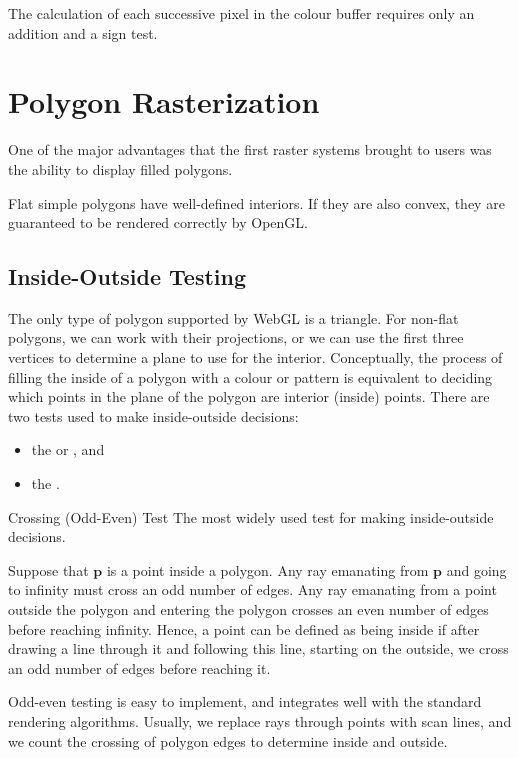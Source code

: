 \documentclass[../COS3712_Notes.tex]{subfiles}
\begin{document}
      The calculation of each successive pixel in the colour buffer requires only an addition
      and a sign test.

    \section{Polygon Rasterization}
      One of the major advantages that the first raster systems brought to users
      was the ability to display filled polygons.

      Flat simple polygons have well-defined interiors.
      If they are also convex, they are guaranteed to be rendered correctly by OpenGL.

      \subsection{Inside-Outside Testing}
        The only type of polygon supported by WebGL is a triangle.
        For non-flat polygons, we can work with their projections, or we can use
        the first three vertices to determine a plane to use for the interior.
        Conceptually, the process of filling the inside of a polygon with a colour or pattern
        is equivalent to deciding which points in the plane of the polygon are interior (inside)
        points.
        There are two tests used to make inside-outside decisions:
        \begin{itemize}[nosep]
          \item the  or , and
          \item the .
        \end{itemize}

        \begin{definition}{Crossing (Odd-Even) Test}
          The most widely used test for making inside-outside decisions.

          Suppose that $\mathbf{p}$ is a point inside a polygon.
          Any ray emanating from $\mathbf{p}$ and going to infinity must cross an odd number
          of edges.
          Any ray emanating from a point outside the polygon and entering the polygon
          crosses an even number of edges before reaching infinity.
          Hence, a point can be defined as being inside if after drawing a line through it
          and following this line, starting on the outside, we cross an odd number of edges
          before reaching it.

          Odd-even testing is easy to implement, and integrates well with the standard rendering
          algorithms.
          Usually, we replace rays through points with scan lines, and we count the crossing
          of polygon edges to determine inside and outside.
        \end{definition}
\end{document}
